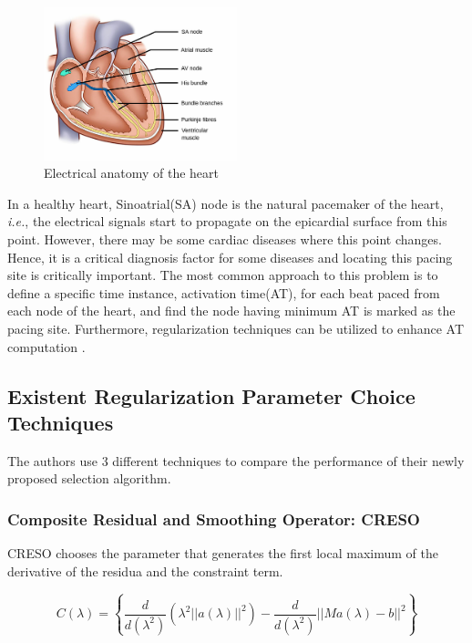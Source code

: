 \documentclass[draftcls, onecolumn, journal]{IEEEtran}
\begin{document}
\begin{figure}[h]
\centering
\includegraphics[width=0.5\textwidth]{../images/SA_Node.png}
\caption{Electrical anatomy of the heart}\label{fig:SANODE}
\end{figure}

In a healthy heart, Sinoatrial(SA) node is the natural pacemaker of the heart, \textit{i.e.}, the electrical signals start to propagate on the epicardial surface from this point. However, there may be some cardiac diseases where this point changes. Hence, it is a critical diagnosis factor for some diseases and locating this pacing site is critically important. The most common approach to this problem is to define a specific time instance, activation time(AT), for each beat paced from each node of the heart, and find the node having minimum AT is marked as the pacing site. Furthermore, regularization techniques can be utilized to enhance AT computation \cite*{erem2013using}.

\subsection{Existent Regularization Parameter Choice Techniques}\label{subsec:paramselect}

The authors use 3 different techniques to compare the performance of their newly proposed selection algorithm. 

\subsubsection{Composite Residual and Smoothing Operator: CRESO}

CRESO \cite{colli1985mathematical} chooses the parameter that generates the first local maximum of the derivative of the residua and the constraint term. 

\begin{equation}
    C(\lambda) = \left\{ \frac{d}{d(\lambda^2)}(\lambda^2||a(\lambda)||^2) -  \frac{d}{d(\lambda^2)}||Ma(\lambda) - b||^2 \right\}
\end{equation}
\end{document}
